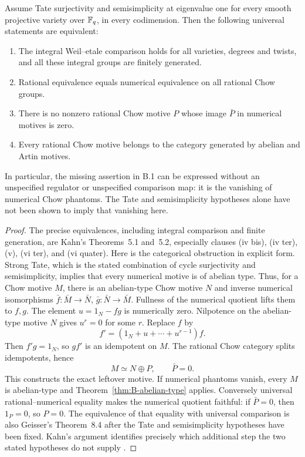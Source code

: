 \begin{proposition}
\label{prop:B-phantom-gate}
Assume Tate surjectivity and semisimplicity at eigenvalue one for
every smooth projective variety over \(\mathbb F_q\), in every
codimension.  Then the following universal statements are equivalent:
\begin{enumerate}
\item The integral Weil--etale comparison holds for all varieties,
degrees and twists, and all these integral groups are finitely generated.
\item Rational equivalence equals numerical equivalence on all
rational Chow groups.
\item There is no nonzero rational Chow motive \(P\) whose image
\(\bar P\) in numerical motives is zero.
\item Every rational Chow motive belongs to the category generated
by abelian and Artin motives.
\end{enumerate}
In particular, the missing assertion in B.1 can be expressed without
an unspecified regulator or unspecified comparison map: it is the
vanishing of numerical Chow phantoms.  The Tate and semisimplicity
hypotheses alone have not been shown to imply that vanishing here.
\end{proposition}
\begin{proof}
The precise equivalences, including integral comparison and finite
generation, are Kahn's Theorems~5.1 and~5.2, especially clauses
(iv bis), (iv ter), (v), (vi ter), and (vi quater).  Here is the
categorical obstruction in explicit form.  Strong Tate, which is
the stated combination of cycle surjectivity and semisimplicity,
implies that every numerical motive is of abelian type.  Thus, for
a Chow motive \(M\), there is an abelian-type Chow motive \(N\)
and inverse numerical isomorphisms
\(\bar f:\bar M\to\bar N\),
\(\bar g:\bar N\to\bar M\).
Fullness of the numerical quotient lifts them to \(f,g\).
The element \(u=1_N-fg\) is numerically zero.  Nilpotence on
the abelian-type motive \(N\) gives \(u^r=0\) for some \(r\).
Replace \(f\) by
\[
 f'=(1_N+u+\cdots+u^{r-1})f.
\]
Then \(f'g=1_N\), so \(gf'\) is an idempotent on \(M\).
The rational Chow category splits idempotents, hence
\[
 M\simeq N\oplus P,\qquad \bar P=0.
\]
This constructs the exact leftover motive.  If numerical phantoms
vanish, every \(M\) is abelian-type and
Theorem~\ref{thm:B-abelian-type} applies.  Conversely universal
rational--numerical equality makes the numerical quotient faithful:
if \(\bar P=0\), then \(1_P=0\), so \(P=0\).
The equivalence of that equality with universal comparison is also
Geisser's Theorem~8.4 after the Tate and semisimplicity hypotheses
have been fixed.  Kahn's argument identifies precisely which
additional step the two stated hypotheses do not supply
\cite[Theorems~5.1--5.2 and the final proof on pp.~999--1000]{BKahn2003}.
\end{proof}

